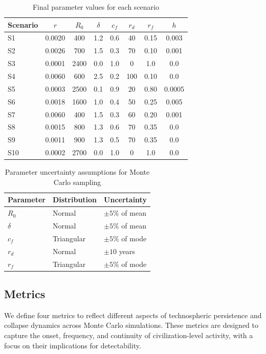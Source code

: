 \begin{table}[htbp]
\centering
\caption{Final parameter values for each scenario}
\label{tab:params}
\begin{tabular}{lccccccc}
\toprule
Scenario & $r$ & $R_0$ & $\delta$ & $c_f$ & $r_d$ & $r_f$ & $h$ \\
\midrule
S1 & 0.0020 & 400 & 1.2 & 0.6 & 40 & 0.15 & 0.003 \\
S2 & 0.0026 & 700 & 1.5 & 0.3 & 70 & 0.10 & 0.001 \\
S3 & 0.0001 & 2400 & 0.0 & 1.0 & 0 & 1.0 & 0.0 \\
S4 & 0.0060 & 600 & 2.5 & 0.2 & 100 & 0.10 & 0.0 \\
S5 & 0.0003 & 2500 & 0.1 & 0.9 & 20 & 0.80 & 0.0005 \\
S6 & 0.0018 & 1600 & 1.0 & 0.4 & 50 & 0.25 & 0.005 \\
S7 & 0.0060 & 400 & 1.5 & 0.3 & 60 & 0.20 & 0.001 \\
S8 & 0.0015 & 800 & 1.3 & 0.6 & 70 & 0.35 & 0.0 \\
S9 & 0.0011 & 900 & 1.3 & 0.5 & 70 & 0.35 & 0.0 \\
S10 & 0.0002 & 2700 & 0.0 & 1.0 & 0 & 1.0 & 0.0 \\
\bottomrule
\end{tabular}
\end{table}

\begin{table}[htbp]
\centering
\caption{Parameter uncertainty assumptions for Monte Carlo sampling}
\label{tab:uncertainty}
\begin{tabular}{lll}
\toprule
Parameter & Distribution & Uncertainty \\
\midrule
$R_0$ & Normal & $\pm 5\%$ of mean \\
$\delta$ & Normal & $\pm 5\%$ of mean \\
$c_f$ & Triangular & $\pm 5\%$ of mode \\
$r_d$ & Normal & $\pm 10$ years \\
$r_f$ & Triangular & $\pm 5\%$ of mode \\
\bottomrule
\end{tabular}
\end{table}

\FloatBarrier

\subsection{Metrics}\label{metrics}

We define four metrics to reflect different aspects of technospheric persistence and collapse dynamics across Monte Carlo simulations. These metrics are designed to capture the onset, frequency, and continuity of civilization-level activity, with a focus on their implications for detectability.

